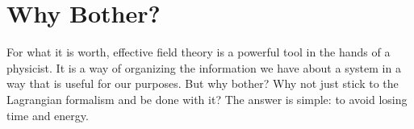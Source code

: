 
\chapter{Why Bother?}
For what it is worth, effective field theory is a powerful tool in the hands of a physicist. It is a way of organizing the information we have about a system in a way that is useful for our purposes. But why bother? Why not just stick to the Lagrangian formalism and be done with it? The answer is simple: to avoid losing time and energy. 